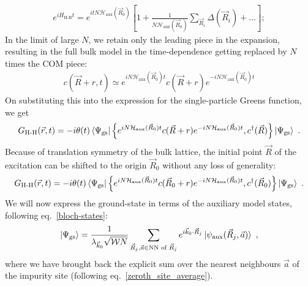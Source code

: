\documentclass[prb]{revtex4-2}
\begin{document}
\begin{equation}\begin{aligned}
	e^{i H_\text{H-H} t} = e^{i t N \mathcal{H}_\text{aux}(\vec R_0)}\left[1 + \frac{1}{N \mathcal{H}_\text{aux}(\vec R_0)}\sum_{\vec R_i} \Delta(\vec R_i) + \ldots\right];
\end{aligned}\end{equation}
In the limit of large \(N\), we retain only the leading piece in the expansion, resulting in the full bulk model in the time-dependence getting replaced by \(N\) times the COM piece:
\begin{equation}\begin{aligned}
	c(\vec R + r,t) \simeq e^{i N \mathcal{H}_\text{aux}(\vec R_0) t}c(\vec R + r)e^{-i N \mathcal{H}_\text{aux}(\vec R_0) t}
\end{aligned}\end{equation}
On substituting this into the expression for the single-particle Greens function, we get
\begin{equation}\begin{aligned}
	G_\text{H-H}(\vec r, t) = -i\theta(t) \braket{\Psi_\text{gs} | \left\{ e^{i N \mathcal{H}_\text{aux}(\vec R_0) t}c(\vec R + r)e^{-i N \mathcal{H}_\text{aux}(\vec R_0) t}, c^\dagger(\vec R) \right\} | \Psi_\text{gs}}~.
\end{aligned}\end{equation}
Because of translation symmetry of the bulk lattice, the initial point \(\vec R\) of the excitation can be shifted to the origin \(\vec R_0\) without any loss of generality:
\begin{equation}\begin{aligned}
	G_\text{H-H}(\vec r, t) = -i\theta(t) \braket{\Psi_\text{gs} | \left\{ e^{i N \mathcal{H}_\text{aux}(\vec R_0) t}c(\vec R_0 + r)e^{-i N \mathcal{H}_\text{aux}(\vec R_0) t}, c^\dagger(\vec R_0) \right\} | \Psi_\text{gs}}~.
\end{aligned}\end{equation}
We will now express the ground-state in terms of the auxiliary model states, following eq.~\ref{bloch-states}:
\begin{equation}\begin{aligned}
	\ket{\Psi_\text{gs}} = \frac{1}{\lambda_{\vec k_0} \sqrt{\mathcal{W} N}}\sum_{\vec R_j, \vec a \in \text{NN of }\vec R_j} e^{i \vec{k}_0\cdot\vec{R}_j} \ket{\psi_\text{aux}(\vec R_j, \vec a)}~,
\end{aligned}\end{equation}
where we have brought back the explicit sum over the nearest neighbours \(\vec a\) of the impurity site (following eq.~\ref{zeroth_site_average}).
\end{document}

